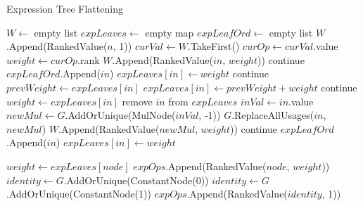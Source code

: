 \documentclass[12pt,openany,a4paper]{book}
\begin{document}
\begin{algorithm}[H]
    \caption{Expression Tree Flattening}
    \begin{algorithmic}[1]
            \State $W \gets$ empty list
            \State $expLeaves \gets$ empty map
            \State $expLeafOrd \gets$ empty list
            \State $W$.Append(RankedValue($n$, 1))
                \State $curVal \gets W$.TakeFirst()
                \State $curOp \gets curVal$.value
                    \State $weight \gets curOp$.rank
                            \State $W$.Append(RankedValue($in$, $weight$))
                            \State continue
                        \EndIf
                    \EndIf
                            \State $expLeafOrd$.Append($in$)
                            \State $expLeaves[in] \gets weight$
                            \State continue
                        \EndIf
                    \Else
                        \State $prevWeight \gets expLeaves[in]$
                        \State $expLeaves[in] \gets prevWeight + weight$
                            \State continue
                        \EndIf
                        \State $weight \gets expLeaves[in]$
                        \State remove $in$ from $expLeaves$
                    \EndIf
                        \State $inVal \gets in$.value
                        \State $newMul \gets G$.AddOrUnique(MulNode($inVal$, -1))
                        \State $G$.ReplaceAllUsages($in$, $newMul$)
                        \State $W$.Append(RankedValue($newMul$, $weight$))
                        \State continue
                    \EndIf
                    \State $expLeafOrd$.Append($in$)
                    \State $expLeaves[in] \gets weight$
                \EndFor
            \EndWhile
    \end{algorithmic}
\end{algorithm}

\begin{algorithm}[H]
    \begin{algorithmic}[1]
                \State $weight \gets expLeaves[node]$
                \State $expOps$.Append(RankedValue($node$, $weight$))
            \EndIf
        \EndFor
                \State $identity \gets G$.AddOrUnique(ConstantNode(0))
                \State $identity \gets G$.AddOrUnique(ConstantNode(1))
            \EndIf
            \State $expOps$.Append(RankedValue($identity$, 1))
        \EndIf
        \EndProcedure
    \end{algorithmic}
\end{algorithm}
\end{document}
